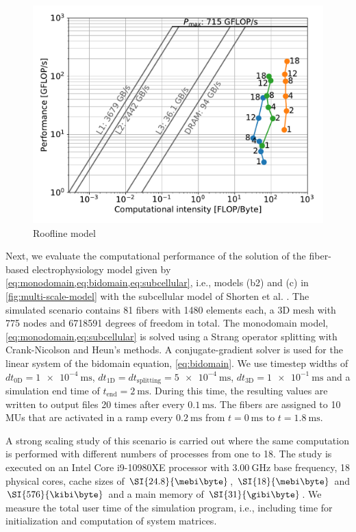 \begin{figure}[H]
  \centering%
  \includegraphics[width=\textwidth]{images/results/studies/0_roofline.pdf}%
  \caption{Roofline model}%
  \label{fig:roofline}%
\end{figure}%


Next, we evaluate the computational performance of the solution of the fiber-based electrophysiology model given by \cref{eq:monodomain,eq:bidomain,eq:subcellular}, i.e., models (b2) and (c) in \cref{fig:multi-scale-model} with the subcellular model of Shorten et al. \cite{Shorten2007}.
The simulated scenario contains 81 fibers with \num{1480} elements each, a 3D mesh with \num{775} nodes and \num{6718591} degrees of freedom in total. The monodomain model, \cref{eq:monodomain,eq:subcellular} is solved using a Strang operator splitting with Crank-Nicolson and Heun's methods. A conjugate-gradient solver is used for the linear system of the bidomain equation, \cref{eq:bidomain}.
We use timestep widths of $dt_\text{0D}=\SI{1e-4}{\milli\second}$, $dt_\text{1D}=dt_\text{splitting}=\SI{5e-4}{\milli\second}$, $dt_\text{3D}=\SI{1e-1}{\milli\second}$ and a simulation end time of $t_\text{end}=\SI{2}{\milli\second}$. During this time, the resulting values are written to output files 20 times after every $\SI{0.1}{\milli\second}$. The fibers are assigned to 10 MUs that are activated in a ramp every $\SI{0.2}{\milli\second}$ from $t=\SI{0}{\milli\second}$ to $t=\SI{1.8}{\milli\second}$.

A strong scaling study of this scenario is carried out where the same computation is performed with different numbers of processes from one to 18. 
The study is executed on an Intel Core i9-10980XE processor with $\SI{3.00}{\giga\hertz}$ base frequency, 18 physical cores, cache sizes of 
$\SI{24.8}{\mebi\byte}$, $\SI{18}{\mebi\byte}$ and $\SI{576}{\kibi\byte}$ and a main memory of $\SI{31}{\gibi\byte}$.
We measure the total user time of the simulation program, i.e., including time for initialization and computation of system matrices.

